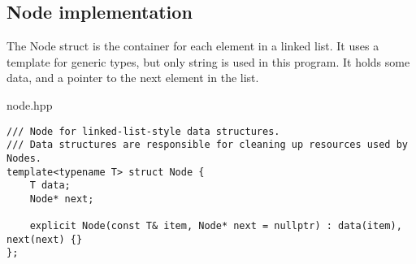 \documentclass[letterpaper, 10pt,DIV=13]{scrartcl}
\numberwithin{equation}{section} %
\numberwithin{figure}{section} %
\numberwithin{table}{section} %
\begin{document}
\subsection{Node implementation}

The Node struct is the container for each element in a linked list. It uses a template for generic types, but only
string is used in this program. It holds some data, and a pointer to the next element in the list.

node.hpp
\begin{verbatim}
/// Node for linked-list-style data structures.
/// Data structures are responsible for cleaning up resources used by Nodes.
template<typename T> struct Node {
    T data;
    Node* next;

    explicit Node(const T& item, Node* next = nullptr) : data(item), next(next) {}
};
\end{verbatim}
\end{document}
